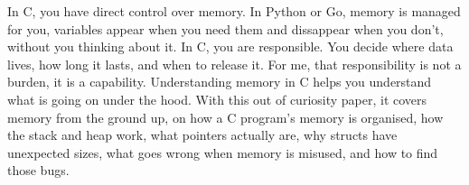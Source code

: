 \begin{onehalfspace}
\noindent
\begin{minipage}{\textwidth}
\fontsize{12pt}{15pt}

  \setlength{\parindent}{2em} In C, you have direct control over memory. In Python or Go, memory is managed for you, variables appear when you need them and dissappear when you don't, without you thinking about it. In C, you are responsible. You decide where data lives, how long it lasts, and when to release it. For me, that responsibility is not a burden, it is a capability. Understanding memory in C helps you understand what is going on under the hood. With this out of curiosity paper, it covers memory from the ground up, on how a C program's memory is organised, how the stack and heap work, what pointers actually are, why structs have unexpected sizes, what goes wrong when memory is misused, and how to find those bugs.

\end{minipage}
\end{onehalfspace}
